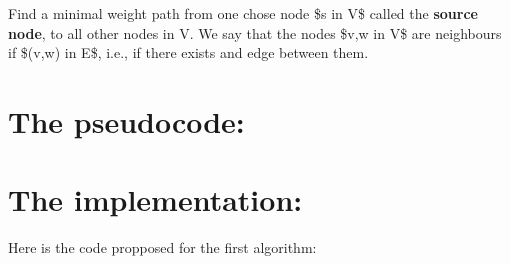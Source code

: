 \documentclass[letterpaper,10pt,english]{sphinxmanual}
\begin{document}
Find a minimal weight path from one chose node \$s in V\$ called the \textbf{source node}, to all other nodes in V. We say that the nodes \$v,w in V\$ are neighbours if \$(v,w) in E\$, i.e., if there exists and edge between them.


\section{The pseudocode:}
\label{Algorithm:the-pseudocode}





\section{The implementation:}
\label{Algorithm:the-implementation}
Here is the code propposed for the first algorithm:
\end{document}
